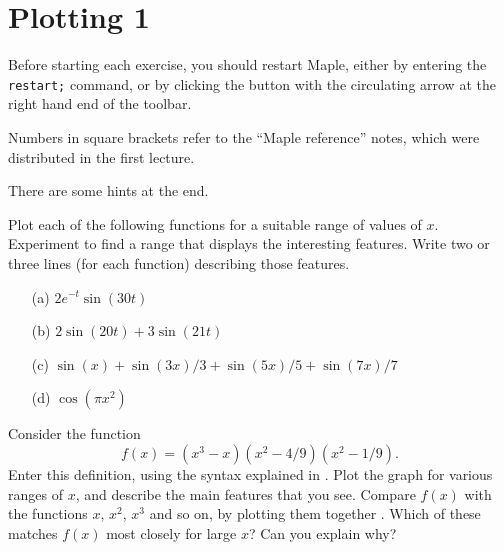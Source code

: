 \documentclass[a4paper,10pt]{amsbook}
\numberwithin{example}{chapter}
\begin{document}
\chapter{Plotting 1}

Before starting each exercise, you should restart Maple, either by
entering the \verb~restart;~ command, or by clicking the button with
the circulating arrow at the right hand end of the toolbar.

Numbers in square brackets refer to the ``Maple
reference'' notes, which were distributed in the first lecture.

There are some hints at the end.

\begin{exercise}\label{ex-plot-misc}
 Plot each of the following functions \note{\NOTEbasicplot}
 for a suitable range of values of $x$.  Experiment to find
 a range that displays the interesting features.  Write two
 or three lines (for each function) describing those
 features.
 \begin{itemize}
  \item[(a)] $2e^{-t}\sin(30 t)$ 
  \item[(b)] $2\sin(20 t)+3\sin(21 t)$
  \item[(c)] $\sin(x)+\sin(3x)/3+\sin(5x)/5+\sin(7x)/7$
  \item[(d)] $\cos(\pi x^2)$
 \end{itemize}
\end{exercise}

\begin{exercise}\label{ex-wiggle}
 Consider the function 
 \[ f(x) = (x^3-x)(x^2-4/9)(x^2-1/9). \] Enter this
 definition, using the syntax explained in
 \note{\NOTEarrow}.  Plot the graph for various ranges of
 $x$, and describe the main features that you see.  Compare
 $f(x)$ with the functions $x$, $x^2$, $x^3$ and so on, by
 plotting them together \note{\NOTEtwoplots}.  Which of
 these matches $f(x)$ most closely for large $x$?  Can you
 explain why?  
\end{exercise}
\end{document}
